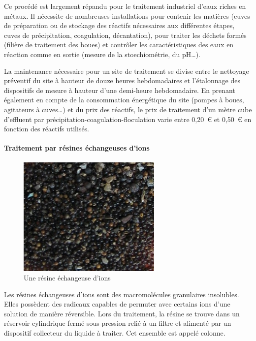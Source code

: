 \documentclass{article}
\begin{document}
Ce procédé est largement répandu pour le traitement industriel d’eaux riches en métaux. Il nécessite de nombreuses installations pour contenir les matières (cuves de préparation ou de stockage des réactifs nécessaires aux différentes étapes, cuves de précipitation, coagulation, décantation), pour traiter les déchets formés (filière de traitement des boues) et contrôler les caractéristiques des eaux en réaction comme en sortie (mesure de la stoechiométrie, du pH…). 

La maintenance nécessaire pour un site de traitement se divise entre le nettoyage préventif du site à hauteur de douze heures hebdomadaires et l’étalonnage des dispositifs de mesure à hauteur d’une demi-heure hebdomadaire. En prenant également en compte de la consommation énergétique du site (pompes à boues, agitateurs à cuves…) et du prix des réactifs, le prix de traitement d’un mètre cube d’effluent par précipitation-coagulation-floculation varie entre 0,20~\euro{} et 0,50~\euro{} en fonction des réactifs utilisés.

\paragraph{Traitement par résines échangeuses d’ions} \hspace{1 em}


\begin{figure}[H]
\centering
\includegraphics[]{III_A_2.png}
\caption{Une résine échangeuse d'ions}
\label{fig:resine_echangeuse_ions}
\end{figure}

Les résines échangeuses d’ions sont des macromolécules granulaires insolubles. Elles possèdent des radicaux capables de permuter avec certains ions d’une solution de manière réversible. Lors du traitement, la résine se trouve dans un réservoir cylindrique fermé sous pression relié à un filtre et alimenté par un dispositif collecteur du liquide à traiter. Cet ensemble est appelé colonne.
\end{document}
